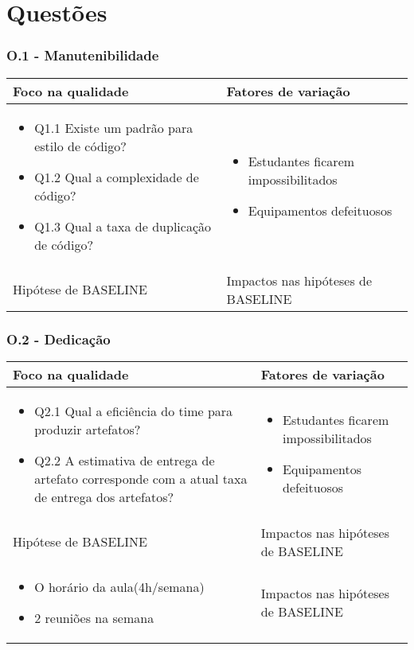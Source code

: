 \chapter{Questões}

\subsection{O.1 - Manutenibilidade}

	\begin{tabular}{ |p{6cm}|p{6cm}|  }
	 \hline
	 Foco na qualidade 		& 		Fatores de variação \\
	 \hline
	 \begin{itemize} \item Q1.1 Existe um padrão para estilo de código? \item Q1.2 Qual a complexidade de código? \item Q1.3 Qual a taxa de duplicação de código? \end{itemize} & \begin{itemize} \item Estudantes ficarem impossibilitados \item Equipamentos defeituosos \end{itemize}\\
	 \hline
	 Hipótese de BASELINE 		& 		Impactos nas hipóteses de BASELINE \\
	 \hline
	\end{tabular}

\subsection{O.2 - Dedicação}

	\begin{tabular}{ |p{6cm}|p{6cm}|  }
	 \hline
	 Foco na qualidade 		& 		Fatores de variação \\
	 \hline
	 \begin{itemize} \item Q2.1 Qual a eficiência do time para produzir artefatos? \item Q2.2 A estimativa de entrega de artefato corresponde com a atual taxa de entrega dos artefatos?\end{itemize} & \begin{itemize} \item Estudantes ficarem impossibilitados \item Equipamentos defeituosos \end{itemize}\\
	 \hline
	 Hipótese de BASELINE 		& 		Impactos nas hipóteses de BASELINE \\
	 \hline
	 \begin{itemize} \item O horário da aula(4h/semana) \item 2 reuniões na semana \end{itemize} 		& 		Impactos nas hipóteses de BASELINE \\
	 \hline
	\end{tabular}
